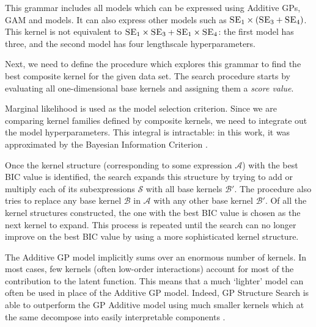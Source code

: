 \documentclass[a4paper,12pt ]{report}
\renewcommand{\GP}{{GP}}
\begin{document}
This grammar includes all models which can be expressed using Additive {\GP}s, GAM and {\SE} models. It can also express other models such as $ \textsc{SE}_1  \times (\textsc{SE}_3 + \textsc{SE}_4)$. This kernel is not equivalent to $\textsc{SE}_1 \times \textsc{SE}_3 + \textsc{SE}_1 \times \textsc{SE}_4$: the first model has three, and the second model has four lengthscale hyperparameters.

Next, we need to define the procedure which explores this grammar to find the best composite kernel for the given data set. The search procedure starts by evaluating all one-dimensional base kernels and assigning them a \emph{score value}.

Marginal likelihood is used as the model selection criterion. Since we are comparing kernel families defined by composite kernels, we need to integrate out the model hyperparameters. This integral is intractable: in this work, it was approximated by the Bayesian Information Criterion \cite{schwarz1978estimating}. %

Once the kernel structure (corresponding to some expression $\mathcal{A}$) with the best BIC value is identified, the search expands this structure by trying to add or multiply each of its subexpressions $\mathcal{S}$ with all base kernels $\mathcal{B'}$. The procedure also tries to replace any base kernel $\mathcal{B}$ in $\mathcal{A}$ with any other base kernel $\mathcal{B'}$. Of all the kernel structures constructed, the one with the best BIC value is chosen as the next kernel to expand. This process is repeated until the search can no longer improve on the best BIC value by using a more sophisticated kernel structure.

The Additive {\GP} model implicitly sums over an enormous number of kernels. In most cases, few kernels (often low-order interactions) account for most of the contribution to the latent function. This means that a much `lighter' model can often be used in place of the Additive {\GP} model. Indeed, {\GP} Structure Search is able to outperform the {\GP} Additive model using much smaller kernels which at the same decompose into easily interpretable components \cite{duvenaud13, lloyd14}. %
\end{document}
